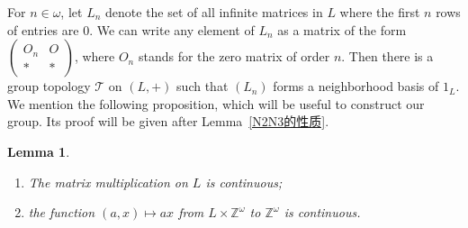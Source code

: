 \documentclass[11pt]{amsart}
\newtheorem{lemma}[theorem]{Lemma}
\theoremstyle{definition}
\theoremstyle{remark}
\numberwithin{equation}{section}
\def\Z {{\mathbb{Z}}}
\begin{document}
For $n\in\omega$, let $L_n$ denote the set of all infinite matrices in $L$ where the first $n$ rows of entries are $0$.
We can write any element of $L_n$ as a matrix of the form $\begin{pmatrix}O_n & O\\ * & *\end{pmatrix}$, where $O_n$ stands for the zero matrix of order $n$.
Then there is a group topology $\mathcal{T}$ on $(L,+)$ such that $(L_n)$ forms a neighborhood basis of $1_L$.
We mention the following proposition, which will be useful to construct our group. Its proof will be given after Lemma~\ref{N2N3的性质}.
\begin{lemma}\label{矩阵乘法和线性变换作用的连续性}
    \begin{enumerate}
        \item[(1)] The matrix multiplication on $L$ is continuous;
        \item[(2)] the function $(a,x)\mapsto ax$ from $L\times\Z^\omega$ to $\Z^\omega$ is continuous.
    \end{enumerate}
\end{lemma}
\end{document}
